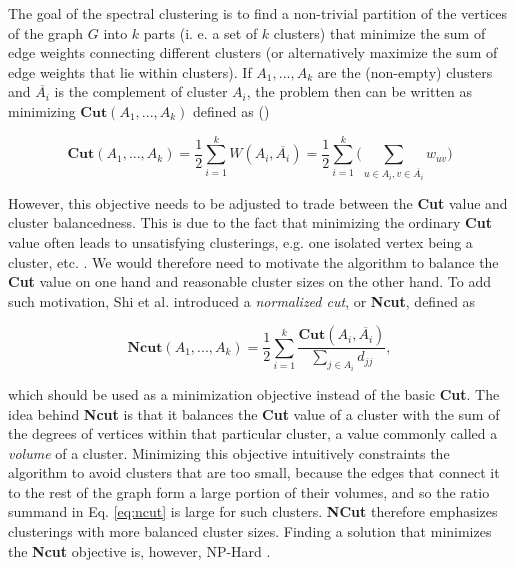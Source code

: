 The goal of the spectral clustering is to find a non-trivial partition of the vertices of the graph $G$ into $k$ parts (i. e. a set of $k$ clusters) that minimize the sum of edge weights connecting different clusters (or alternatively maximize the sum of edge weights that lie within clusters). If $A_1, ..., A_k$ are the (non-empty) clusters and $\overline{A_i}$ is the complement of cluster $A_i$, the problem then can be written as minimizing $\textbf{Cut}(A_1, ..., A_k)$ defined as (\cite{von2007tutorial})

\begin{equation}
    \textbf{Cut}(A_1, ..., A_k) = \frac{1}{2}
    \sum_{i=1}^k W(A_i, \overline{A_i}) = \frac{1}{2}
     \sum_{i=1}^k \Bigg( \sum_{u\in A_i, v \in \overline{A_i}} w_{uv} \Bigg)
\end{equation}

However, this objective needs to be adjusted to trade between the \textbf{Cut} value and cluster balancedness. This is due to the fact that minimizing the ordinary \textbf{Cut} value often leads to unsatisfying clusterings, e.g. one isolated vertex being a cluster, etc. \cite{von2007tutorial, shi2000normalized}. We would therefore need to motivate the algorithm to balance the \textbf{Cut} value on one hand and reasonable cluster sizes on the other hand. To add such motivation, Shi et al. \cite{shi2000normalized} introduced a \textit{normalized cut}, or \textbf{Ncut}, defined as

\begin{equation}
    \textbf{Ncut}(A_1, ..., A_k) = \frac{1}{2}
    \sum_{i=1}^k \frac{\textbf{Cut}(A_i, \overline{A_i})}
    {
        \sum_{j \in A_i} d_{jj}
    },
\label{eq:ncut}
\end{equation}

which should be used as a minimization objective instead of the basic \textbf{Cut}. The idea behind \textbf{Ncut} is that it balances the \textbf{Cut} value of a cluster with the sum of the degrees of vertices within that particular cluster, a value commonly called a \textit{volume} of a cluster. Minimizing this objective intuitively constraints the algorithm to avoid clusters that are too small, because the edges that connect it to the rest of the graph form a large portion of their volumes, and so the ratio summand in Eq. \ref{eq:ncut} is large \cite{shi2000normalized} for such clusters. \textbf{NCut} therefore emphasizes clusterings with more balanced cluster sizes. Finding a solution that minimizes the \textbf{Ncut} objective is, however, NP-Hard \cite{von2007tutorial}.

